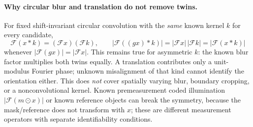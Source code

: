 \paragraph{Why circular blur and translation do not remove twins.}
For fixed shift-invariant circular convolution with the \emph{same}
known kernel $k$ for every candidate,
\[
 \mathcal F(x*k)=(\mathcal F x)(\mathcal F k),\qquad
 |\mathcal F((gx)*k)|=|\mathcal Fx|\,|\mathcal Fk|
 =|\mathcal F(x*k)|
\]
whenever $|\mathcal F(gx)|=|\mathcal F x|$. This remains true for
asymmetric $k$: the known blur factor multiplies both twins equally.
A translation contributes only a unit-modulus Fourier phase; unknown
misalignment of that kind cannot identify the orientation either.
This does \emph{not} cover spatially varying blur, boundary cropping,
or a nonconvolutional kernel. Known premeasurement coded illumination
$|\mathcal F(m\odot x)|$ or known reference objects can break the
symmetry, because the mask/reference does not transform with $x$;
these are different measurement operators with separate
identifiability conditions.

